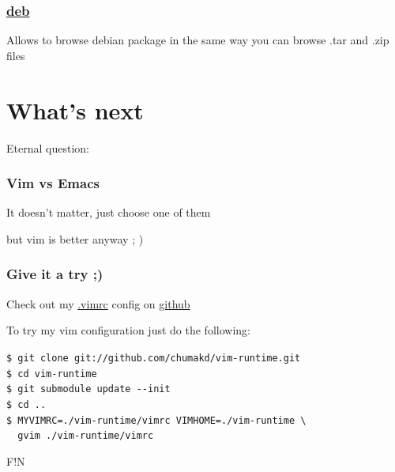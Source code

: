 \documentclass[14pt,svgnames,compress]{beamer}
\newcommand{\titlefontsize}{\fontsize{64}{70}\selectfont}
\newcommand\hl[1]{\textcolor{HlColor}{#1}}
\newcommand\framesubtitlefontsize{\huge}
\newcommand\singleframesubtitle[1]{
    \begin{center}
        \framesubtitlefontsize #1
    \end{center}
}
\begin{document}
\begin{frame}
    \frametitle{
        \href{https://github.com/vim-scripts/deb.vim}
             {deb}
    }
    \large
    Allows to browse debian package in the same way you can browse .tar and .zip
    files \\
\end{frame}


\section{What's next}

\begin{frame}
    \singleframesubtitle{Eternal question:}
\end{frame}

\begin{frame}[plain]
    \frametitle{Vim vs Emacs}
\end{frame}

\begin{frame}
    \singleframesubtitle{It doesn't matter, just choose one of them}
    \scriptsize but vim is better anyway  ; ) \\
\end{frame}

\begin{frame}[fragile]
    \frametitle{Give it a try \hl{;)}}

    \large
    Check out my \href{https://github.com/chumakd/vim-runtime/blob/master/vimrc}{.vimrc}
    config on \href{https://github.com/chumakd/vim-runtime}{github} \\ \bigskip

    To try my vim configuration just do the following: \\ \bigskip

    \smallskip
    \scriptsize
    \verb|$ git clone git://github.com/chumakd/vim-runtime.git| \\ \smallskip
    \verb|$ cd vim-runtime| \\ \smallskip
    \verb|$ git submodule update --init| \\ \smallskip
    \verb|$ cd ..| \\ \smallskip
    \verb|$ MYVIMRC=./vim-runtime/vimrc VIMHOME=./vim-runtime \| \\
    \verb|  gvim ./vim-runtime/vimrc| \\
\end{frame}

\begin{frame}
    \begin{center}
        \titlefontsize F!N
    \end{center}
\end{frame}
\end{document}
